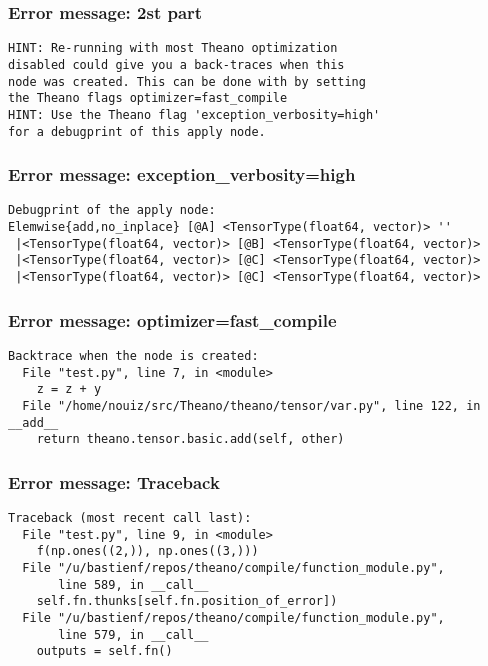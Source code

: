 \documentclass[utf8x,xcolor=pdftex,dvipsnames,table]{beamer}
\begin{document}
\begin{frame}[fragile]
  \frametitle{Error message: 2st part}

\begin{lstlisting}
HINT: Re-running with most Theano optimization
disabled could give you a back-traces when this
node was created. This can be done with by setting
the Theano flags optimizer=fast_compile
HINT: Use the Theano flag 'exception_verbosity=high'
for a debugprint of this apply node.
\end{lstlisting}
\end{frame}

\begin{frame}[fragile]
  \frametitle{Error message: exception\_verbosity=high}

\begin{lstlisting}
Debugprint of the apply node:
Elemwise{add,no_inplace} [@A] <TensorType(float64, vector)> ''
 |<TensorType(float64, vector)> [@B] <TensorType(float64, vector)>
 |<TensorType(float64, vector)> [@C] <TensorType(float64, vector)>
 |<TensorType(float64, vector)> [@C] <TensorType(float64, vector)>

\end{lstlisting}
\end{frame}

\begin{frame}[fragile]
  \frametitle{Error message: optimizer=fast\_compile}

\begin{lstlisting}
Backtrace when the node is created:
  File "test.py", line 7, in <module>
    z = z + y
  File "/home/nouiz/src/Theano/theano/tensor/var.py", line 122, in __add__
    return theano.tensor.basic.add(self, other)

\end{lstlisting}
\end{frame}

\begin{frame}[fragile]
  \frametitle{Error message: Traceback}

\begin{lstlisting}
Traceback (most recent call last):
  File "test.py", line 9, in <module>
    f(np.ones((2,)), np.ones((3,)))
  File "/u/bastienf/repos/theano/compile/function_module.py",
       line 589, in __call__
    self.fn.thunks[self.fn.position_of_error])
  File "/u/bastienf/repos/theano/compile/function_module.py",
       line 579, in __call__
    outputs = self.fn()

\end{lstlisting}
\end{frame}
\end{document}
